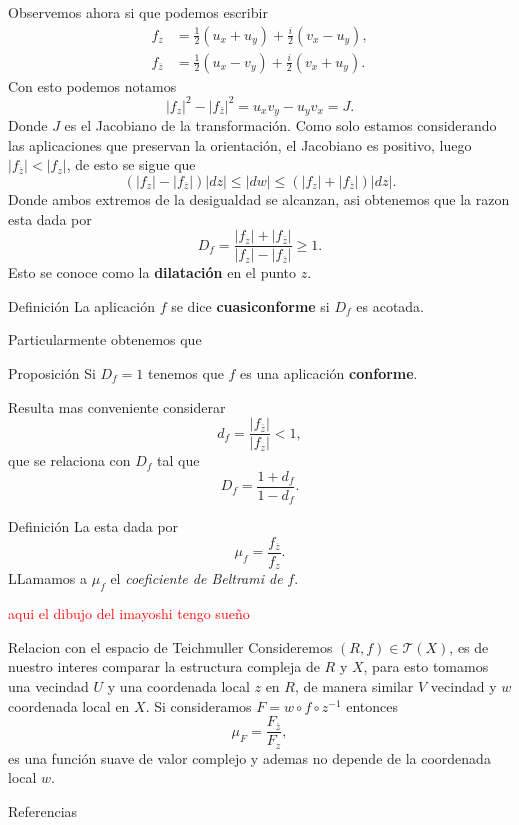 \documentclass[xcolor=dvipsnames,10pt]{beamer}
\begin{document}
\begin{frame}
    Observemos ahora si que podemos escribir
    \begin{align*}
        f_z&=\frac{1}{2}(u_x+u_y)+\frac{i}{2}(v_x-u_y),\\
        f_{\overline{z}}&=\frac{1}{2}(u_x-v_y)+\frac{i}{2}(v_x+u_y).
    \end{align*}
    Con esto podemos notamos
    $$|f_z|^2-|f_{\overline{z}}|^2=u_xv_y-u_yv_x=J.$$
    Donde $J$ es el Jacobiano de la transformación. Como solo estamos considerando las aplicaciones que preservan la orientación, el Jacobiano es positivo, luego $|f_{\overline{z}}|<|f_z|$, de esto se sigue que
    $$(|f_z|-|f_{\overline{z}}|)|dz|\leq |dw|\leq (|f_z|+|f_{\overline{z}}|)|dz|.$$
    Donde ambos extremos de la desigualdad se alcanzan, asi obtenemos que la razon esta dada por
    $$D_f=\frac{|f_z|+|f_{\overline{z}}|}{|f_z|-|f_{\overline{z}}|}\geq 1.$$
    Esto se conoce como la \textbf{dilatación} en el punto $z$.
\end{frame}

\begin{frame}
    \begin{block}{Definición}
        La aplicación $f$ se dice \textbf{cuasiconforme} si $D_f$ es acotada.
        \end{block}
        Particularmente obtenemos que
\begin{block}{Proposición}
Si $D_f=1$ tenemos que $f$ es una aplicación \textbf{conforme}.
\end{block}
Resulta mas conveniente considerar
    $$d_f=\frac{|f_{\overline{z}}|}{|f_z|}<1,$$
    que se relaciona con $D_f$ tal que
    $$D_f=\frac{1+d_f}{1-d_f}.$$
\end{frame}
\begin{frame}
    \begin{block}{Definición}
        La  esta dada por
        $$\mu_f=\frac{f_{\overline{z}}}{f_z}.$$
        LLamamos a $\mu_f$ el \textit{coeficiente de Beltrami de }$f.$
    \end{block}
    \textcolor{red}{aqui el dibujo del imayoshi tengo sueño}
\end{frame}

\begin{frame}{Relacion con el espacio de Teichmuller}
    Consideremos $(R,f)\in\mathcal{T}(X)$, es de nuestro interes comparar la estructura compleja de $R$ y $X$, para esto tomamos una vecindad $U$ y una coordenada local $z$ en $R$, de manera similar $V$ vecindad y $w$ coordenada local en $X.$ Si consideramos $F=w\circ f\circ z^{-1}$ entonces 
    $$\mu_F=\frac{F_{\overline{z}}}{F_z},$$
    es una función suave de valor complejo y ademas no depende de la coordenada local $w.$
\end{frame}
\begin{frame}{Referencias}

\end{frame}
\end{document}
